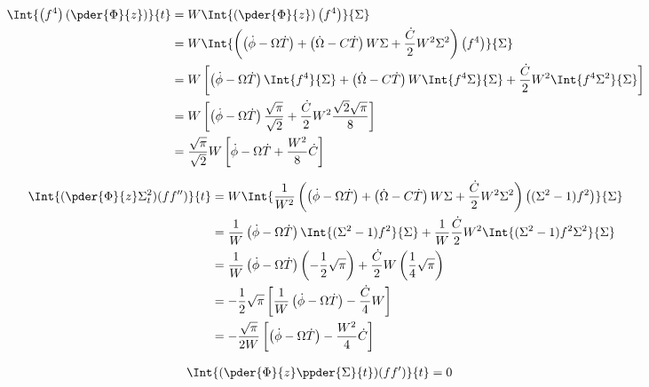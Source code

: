 \begin{equation}
\begin{split}
\Int{\left(f^4\right)  \left(\pder{\Phi}{z}\right)}{t}  &= W \Int{ \left(\pder{\Phi}{z}\right) \left(f^4\right) }{\Sigma}\\
&= W \Int{  \left( \left(\dot{\phi}- \Omega\dot{T}\right) + \left(\dot{\Omega}- C\dot{T}\right)W \Sigma  + \frac{\dot{C}}{2}W^2 \Sigma^2 \right) \left(f^4\right)}{\Sigma}\\
& = W\left[\left(\dot{\phi}- \Omega\dot{T}\right)\Int{f^4}{\Sigma} + \left(\dot{\Omega}- C\dot{T}\right)W \Int{ f^4 \Sigma}{\Sigma}  + \frac{\dot{C}}{2}W^2 \Int{ f^4 \Sigma^2}{\Sigma} \right]  \\
& = W\left[\left(\dot{\phi}- \Omega\dot{T}\right)\frac{\sqrt{\pi}}{\sqrt{2}} + \frac{\dot{C}}{2}W^2 \frac{\sqrt{2}\sqrt{\pi}}{8} \right]  \\
& = \frac{\sqrt{\pi}}{\sqrt{2}}W\left[\dot{\phi}- \Omega\dot{T} + \frac{W^2}{8}\dot{C} \right]  \\
\end{split}
\end{equation}

\begin{equation}
\begin{split}
\Int{(\pder{\Phi}{z} \Sigma_{t}^2)(ff'')}{t}  &= W \Int{ \frac{1}{W^2}\left(\left(\dot{\phi}- \Omega\dot{T}\right) + \left(\dot{\Omega}- C\dot{T}\right) W \Sigma  + \frac{\dot{C}}{2}W^2 \Sigma^2 \right)\left((\Sigma^2 - 1) f^2\right)}{\Sigma}\\
&= \frac{1}{W}\left(\dot{\phi}- \Omega\dot{T}\right) \Int{(\Sigma^2 - 1) f^2}{\Sigma} + \frac{1}{W} \frac{\dot{C}}{2}W^2\Int{(\Sigma^2 - 1) f^2 \Sigma^2 }{\Sigma}\\
&= \frac{1}{W}\left(\dot{\phi}- \Omega\dot{T}\right)\left( -\frac{1}{2}\sqrt{\pi} \right) + \frac{\dot{C}}{2}W\left( \frac{1}{4}\sqrt{\pi} \right) \\
&= -\frac{1}{2}\sqrt{\pi} \left[\frac{1}{W}\left(\dot{\phi}- \Omega\dot{T} \right)- \frac{\dot{C}}{4}W \right] \\
&= -\frac{\sqrt{\pi} }{2W}\left[\left(\dot{\phi}- \Omega\dot{T} \right)- \frac{W^2}{4} \dot{C}\right] \\
\end{split}
\end{equation}

\begin{equation}
\begin{split}
\Int{ (\pder{\Phi}{z} \ppder{\Sigma}{t}) (ff')}{t}  &= 0
\end{split}
\end{equation}

